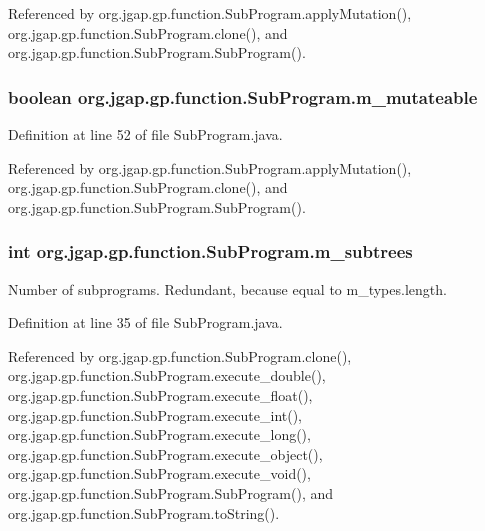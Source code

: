 Referenced by org.\-jgap.\-gp.\-function.\-Sub\-Program.\-apply\-Mutation(), org.\-jgap.\-gp.\-function.\-Sub\-Program.\-clone(), and org.\-jgap.\-gp.\-function.\-Sub\-Program.\-Sub\-Program().

\hypertarget{classorg_1_1jgap_1_1gp_1_1function_1_1_sub_program_a9af15731317fff5d51db159ceea8bdb9}{
\subsubsection[{m\-\_\-mutateable}]{\setlength{\rightskip}{0pt plus 5cm}boolean org.\-jgap.\-gp.\-function.\-Sub\-Program.\-m\-\_\-mutateable\hspace{0.3cm}{\ttfamily [private]}}}\label{classorg_1_1jgap_1_1gp_1_1function_1_1_sub_program_a9af15731317fff5d51db159ceea8bdb9}


Definition at line 52 of file Sub\-Program.\-java.



Referenced by org.\-jgap.\-gp.\-function.\-Sub\-Program.\-apply\-Mutation(), org.\-jgap.\-gp.\-function.\-Sub\-Program.\-clone(), and org.\-jgap.\-gp.\-function.\-Sub\-Program.\-Sub\-Program().

\hypertarget{classorg_1_1jgap_1_1gp_1_1function_1_1_sub_program_a9593900f6e735a80870297491f38d5bf}{
\subsubsection[{m\-\_\-subtrees}]{\setlength{\rightskip}{0pt plus 5cm}int org.\-jgap.\-gp.\-function.\-Sub\-Program.\-m\-\_\-subtrees\hspace{0.3cm}{\ttfamily [private]}}}\label{classorg_1_1jgap_1_1gp_1_1function_1_1_sub_program_a9593900f6e735a80870297491f38d5bf}
Number of subprograms. Redundant, because equal to m\-\_\-types.\-length. 

Definition at line 35 of file Sub\-Program.\-java.



Referenced by org.\-jgap.\-gp.\-function.\-Sub\-Program.\-clone(), org.\-jgap.\-gp.\-function.\-Sub\-Program.\-execute\-\_\-double(), org.\-jgap.\-gp.\-function.\-Sub\-Program.\-execute\-\_\-float(), org.\-jgap.\-gp.\-function.\-Sub\-Program.\-execute\-\_\-int(), org.\-jgap.\-gp.\-function.\-Sub\-Program.\-execute\-\_\-long(), org.\-jgap.\-gp.\-function.\-Sub\-Program.\-execute\-\_\-object(), org.\-jgap.\-gp.\-function.\-Sub\-Program.\-execute\-\_\-void(), org.\-jgap.\-gp.\-function.\-Sub\-Program.\-Sub\-Program(), and org.\-jgap.\-gp.\-function.\-Sub\-Program.\-to\-String().

